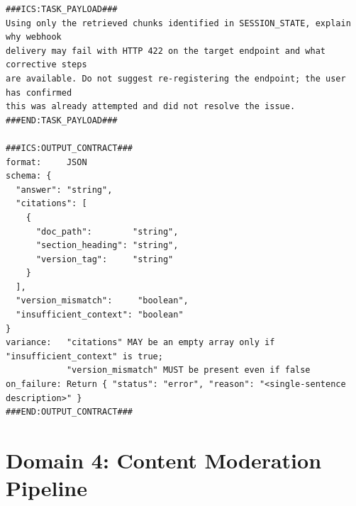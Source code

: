 \documentclass[11pt]{article}
\begin{document}
\begin{lstlisting}[language=ICS, basicstyle=\ttfamily\footnotesize]
###ICS:TASK_PAYLOAD###
Using only the retrieved chunks identified in SESSION_STATE, explain why webhook
delivery may fail with HTTP 422 on the target endpoint and what corrective steps
are available. Do not suggest re-registering the endpoint; the user has confirmed
this was already attempted and did not resolve the issue.
###END:TASK_PAYLOAD###

###ICS:OUTPUT_CONTRACT###
format:     JSON
schema: {
  "answer": "string",
  "citations": [
    {
      "doc_path":        "string",
      "section_heading": "string",
      "version_tag":     "string"
    }
  ],
  "version_mismatch":     "boolean",
  "insufficient_context": "boolean"
}
variance:   "citations" MAY be an empty array only if "insufficient_context" is true;
            "version_mismatch" MUST be present even if false
on_failure: Return { "status": "error", "reason": "<single-sentence description>" }
###END:OUTPUT_CONTRACT###
\end{lstlisting}


\section{Domain 4: Content Moderation Pipeline}
\label{app:moderation}
\end{document}
